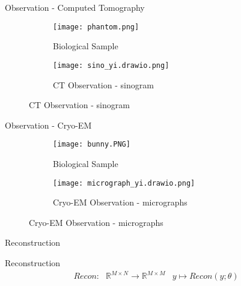 \begin{frame}{Observation - Computed Tomography }

    \begin{figure}
    \centering
    \begin{subfigure}{0.4\textwidth}
        \texttt{[image: phantom.png]}
        \caption{Biological Sample}
    \end{subfigure}
    \begin{subfigure}{0.4\textwidth}
        \texttt{[image: sino\_yi.drawio.png]}
        \caption{CT Observation - sinogram}
    \end{subfigure}
\end{figure}

\end{frame}


\begin{frame}{Observation - Cryo-EM }

    \begin{figure}
        \centering
        \begin{subfigure}[t]{0.3\textwidth}
            \texttt{[image: bunny.PNG]}
            \caption{Biological Sample}
        \end{subfigure}
        \begin{subfigure}[t]{0.65\textwidth}
            \texttt{[image: micrograph\_yi.drawio.png]}
            \caption{Cryo-EM Observation - micrographs}
        \end{subfigure}
    \end{figure}

\end{frame}



\begin{frame}{Reconstruction}

    \begin{block}{Reconstruction}
        \begin{equation}
            \begin{aligned}
                \textit{Recon} : & \mathbb{R}^{M \times N} \to \mathbb{R}^{M \times M} & y \mapsto Recon(y; \theta)
            \end{aligned}
        \end{equation}
    \end{block}

\end{frame}

